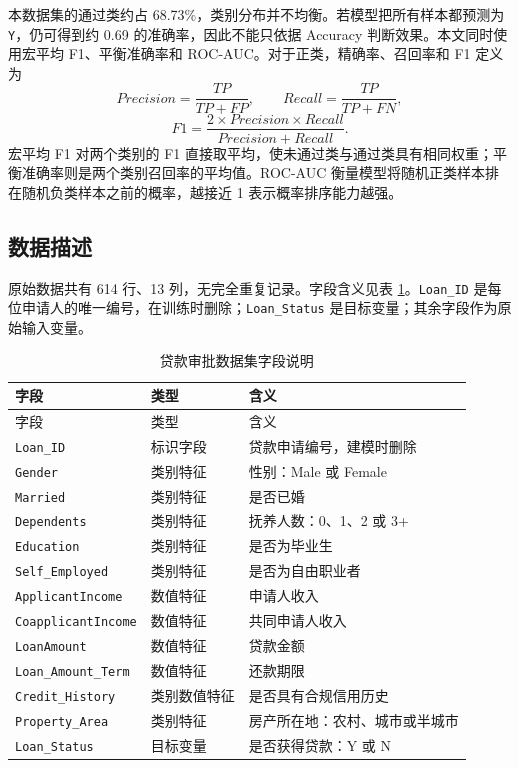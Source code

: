 \documentclass[UTF8,a4paper,12pt]{ctexart}
\begin{document}
本数据集的通过类约占 68.73\%，类别分布并不均衡。若模型把所有样本都预测为 \texttt{Y}，仍可得到约 0.69 的准确率，因此不能只依据 Accuracy 判断效果。本文同时使用宏平均 F1、平衡准确率和 ROC-AUC。对于正类，精确率、召回率和 F1 定义为
\begin{equation}
    Precision=\frac{TP}{TP+FP},\qquad
    Recall=\frac{TP}{TP+FN},
\end{equation}
\begin{equation}
    F1=\frac{2\times Precision\times Recall}{Precision+Recall}.
\end{equation}
宏平均 F1 对两个类别的 F1 直接取平均，使未通过类与通过类具有相同权重；平衡准确率则是两个类别召回率的平均值。ROC-AUC 衡量模型将随机正类样本排在随机负类样本之前的概率，越接近 1 表示概率排序能力越强。

\subsection{数据描述}

原始数据共有 614 行、13 列，无完全重复记录。字段含义见表 \ref{tab:features}。\texttt{Loan\_ID} 是每位申请人的唯一编号，在训练时删除；\texttt{Loan\_Status} 是目标变量；其余字段作为原始输入变量。

\begin{longtable}{lll}
\caption{贷款审批数据集字段说明}\label{tab:features}\\
\toprule
字段 & 类型 & 含义\\
\midrule
\endfirsthead
\toprule
字段 & 类型 & 含义\\
\midrule
\endhead
\texttt{Loan\_ID} & 标识字段 & 贷款申请编号，建模时删除\\
\texttt{Gender} & 类别特征 & 性别：Male 或 Female\\
\texttt{Married} & 类别特征 & 是否已婚\\
\texttt{Dependents} & 类别特征 & 抚养人数：0、1、2 或 3+\\
\texttt{Education} & 类别特征 & 是否为毕业生\\
\texttt{Self\_Employed} & 类别特征 & 是否为自由职业者\\
\texttt{ApplicantIncome} & 数值特征 & 申请人收入\\
\texttt{CoapplicantIncome} & 数值特征 & 共同申请人收入\\
\texttt{LoanAmount} & 数值特征 & 贷款金额\\
\texttt{Loan\_Amount\_Term} & 数值特征 & 还款期限\\
\texttt{Credit\_History} & 类别数值特征 & 是否具有合规信用历史\\
\texttt{Property\_Area} & 类别特征 & 房产所在地：农村、城市或半城市\\
\texttt{Loan\_Status} & 目标变量 & 是否获得贷款：Y 或 N\\
\bottomrule
\end{longtable}
\end{document}

